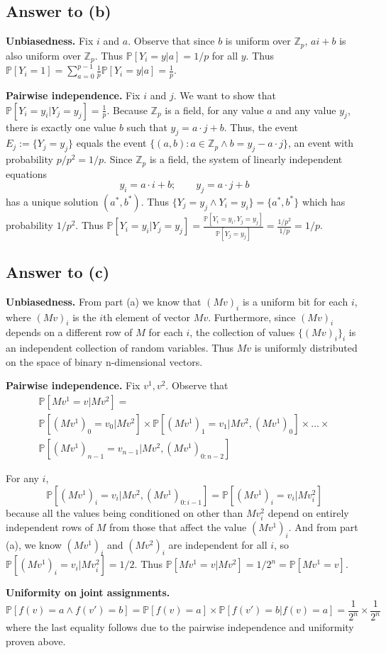 \documentclass{article}
\begin{document}
\subsection*{Answer to (b)}

\textbf{Unbiasedness.}
Fix $i$ and $a$.  Observe that since $b$ is uniform over $\mathbb{Z}_p$, $ai + b$ is also uniform over $\mathbb{Z}_p$.  Thus $\mathbb{P}[Y_i = y | a] = 1/p$ for all $y$.  Thus $\mathbb{P}[Y_i = 1] = \sum_{a = 0}^{p-1}\frac{1}{p}\mathbb{P}[Y_i = y | a] = \frac{1}{p}$.

\textbf{Pairwise independence.}
Fix $i$ and $j$.
We want to show that $\mathbb{P}[Y_i = y_i | Y_j = y_j] = \frac{1}{p}$.
Because $\mathbb{Z}_p$ is a field, for any value $a$ and any value $y_j$, there is exactly one value $b$ such that $y_j = a \cdot j + b$.
Thus, the event $E_j := \{Y_j = y_j\}$ equals the event $\{(a, b) : a \in \mathbb{Z}_p \wedge b = y_j - a \cdot j\}$, an event with probability $p/p^2 = 1/p$.
Since $\mathbb{Z}_p$ is a field, the system of linearly independent equations
$$
y_i = a \cdot i + b; \qquad y_j = a \cdot j + b
$$
has a unique solution $(a^*, b^*)$.
Thus $\{Y_j = y_j \wedge Y_i = y_i\} = \{a^*, b^*\}$ which has probability $1/p^2$.
Thus $\mathbb{P}[Y_i = y_i | Y_j = y_j] = \frac{\mathbb{P}[Y_i = y_i, Y_j = y_j]}{\mathbb{P}[Y_j = y_j]} = \frac{1/p^2}{1/p} = 1/p$.
\subsection*{Answer to (c)}

\textbf{Unbiasedness.} From part (a) we know that $(Mv)_i$ is a uniform bit for each $i$, where $(Mv)_i$ is the $i$th element of vector $Mv$.  Furthermore, since $(Mv)_i$ depends on a different row of $M$ for each $i$, the collection of values $\{(Mv)_i\}_i$ is an independent collection of random variables.  Thus $Mv$ is uniformly distributed on the space of binary n-dimensional vectors.

\textbf{Pairwise independence.}
Fix $v^1, v^2$.
Observe that 
\begin{multline*}
\mathbb{P}[Mv^1 = v | Mv^2] = \\
\mathbb{P}[(Mv^1)_0 = v_0 | Mv^2] \times 
\mathbb{P}[(Mv^1)_1 = v_1 | Mv^2, (Mv^1)_0] \times \dots \times \\
\mathbb{P}[(Mv^1)_{n-1} = v_{n-1} | Mv^2, (Mv^1)_{0:n-2}]
\end{multline*}

\noindent For any $i$,
$$
\mathbb{P}[(Mv^1)_i = v_i | Mv^2, (Mv^1)_{0:i-1}] =
\mathbb{P}[(Mv^1)_i = v_i | Mv^2_i]
$$
because all the values being conditioned on other than $Mv^2_i$ depend on entirely independent rows of $M$ from those that affect the value $(Mv^1)_i$.
And from part (a), we know $(Mv^1)_i$ and $(Mv^2)_i$ are independent for all $i$, so $\mathbb{P}[(Mv^1)_i = v_i | Mv^2_i] = 1/2$.
Thus $\mathbb{P}[Mv^1 = v | Mv^2] = 1/2^n = \mathbb{P}[Mv^1 = v]$.

\smallskip
\noindent \textbf{Uniformity on joint assignments.}
\vspace{-4mm}
$$
\mathbb{P}[f(v) = a \wedge f(v') = b] =
\mathbb{P}[f(v) = a]\times\mathbb{P}[f(v') = b | f(v) = a]
= \frac{1}{2^n} \times \frac{1}{2^n}
$$
where the last equality follows due to the pairwise independence and uniformity proven above.
\end{document}
